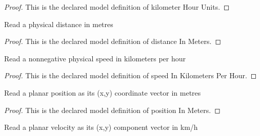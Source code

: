 \begin{proof}
  This is the declared model definition of kilometer Hour Units.
\end{proof}
\begin{definition}
  \label{def:physics:phyx-mini-0748:phyxminiproblems-problemphyxmini0748-distanceinmeters}
  Read a physical distance in metres
\end{definition}
\begin{proof}
  This is the declared model definition of distance In Meters.
\end{proof}
\begin{definition}
  \label{def:physics:phyx-mini-0748:phyxminiproblems-problemphyxmini0748-speedinkilometersperhour}
  Read a nonnegative physical speed in kilometers per hour
\end{definition}
\begin{proof}
  This is the declared model definition of speed In Kilometers Per Hour.
\end{proof}
\begin{definition}
  \label{def:physics:phyx-mini-0748:phyxminiproblems-problemphyxmini0748-positioninmeters}
  Read a planar position as its (x,y) coordinate vector in metres
\end{definition}
\begin{proof}
  This is the declared model definition of position In Meters.
\end{proof}
\begin{definition}
  \label{def:physics:phyx-mini-0748:phyxminiproblems-problemphyxmini0748-velocityinkilometersperhour}
  Read a planar velocity as its (x,y) component vector in km/h
\end{definition}
